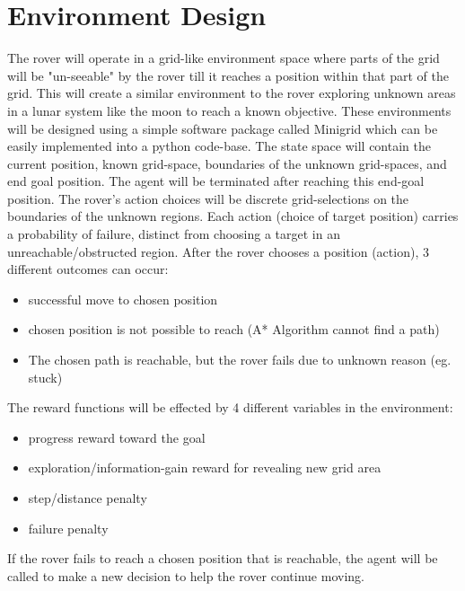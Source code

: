 \documentclass[12pt]{article}
\begin{document}
\section*{Environment Design}
The rover will operate in a grid-like environment space where parts of the grid will be "un-seeable" by the rover till it reaches a position within that part of the grid.
This will create a similar environment to the rover exploring unknown areas in a lunar system like the moon to reach a known objective.
These environments will be designed using a simple software package called Minigrid which can be easily implemented into a python code-base.
The state space will contain the current position, known grid-space, boundaries of the unknown grid-spaces, and end goal position.
The agent will be terminated after reaching this end-goal position.
The rover's action choices will be discrete grid-selections on the boundaries of the unknown regions.
Each action (choice of target position) carries a probability of failure, distinct from choosing a target in an unreachable/obstructed region.
After the rover chooses a position (action), 3 different outcomes can occur:
\begin{itemize}
    \item successful move to chosen position
    \item chosen position is not possible to reach (A* Algorithm cannot find a path)
    \item The chosen path is reachable, but the rover fails due to unknown reason (eg. stuck)
\end{itemize}
The reward functions will be effected by 4 different variables in the environment:
\begin{itemize}
    \item progress reward toward the goal
    \item exploration/information-gain reward for revealing new grid area
    \item step/distance penalty 
    \item failure penalty
\end{itemize}
If the rover fails to reach a chosen position that is reachable, the agent will be called to make a new decision to help the rover continue moving. 

%
\end{document}
